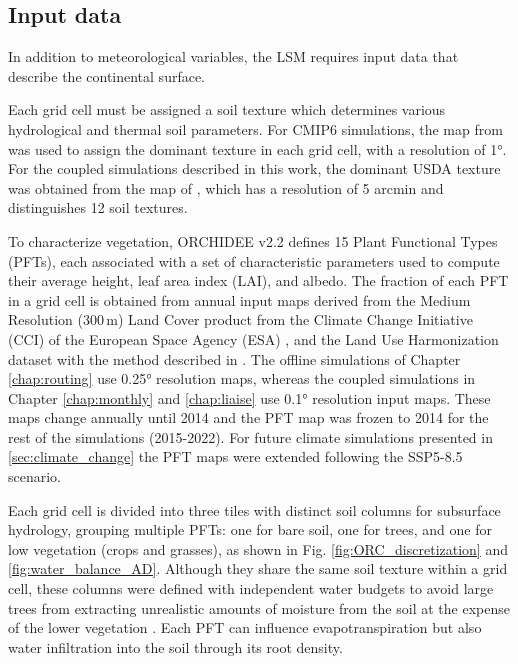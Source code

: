 \subsection{Input data}
\label{sec:ORCH_input_data}
In addition to meteorological variables, the LSM requires input data that describe the continental surface. 

Each grid cell must be assigned a soil texture which determines various hydrological and thermal soil parameters. 
For CMIP6 simulations, the map from \citet{zobler87802world} was used to assign the dominant texture in each grid cell, with a resolution of 1°. For the coupled simulations described in this work, the dominant USDA texture was obtained from the map of \citet{reynolds_estimating_2000}, which has a resolution of 5 arcmin and distinguishes 12 soil textures.

To characterize vegetation, ORCHIDEE v2.2 defines 15 Plant Functional Types (PFTs), each associated with a set of characteristic parameters used to compute their average height, leaf area index (LAI), and albedo. 
The fraction of each PFT in a grid cell is obtained from annual input maps derived from the Medium Resolution (300\,m) Land Cover product from the Climate Change Initiative (CCI) of the European Space Agency (ESA) \citep{bontemps_multi-year_2015}, and the Land Use Harmonization dataset \citep[LUH, ][]{hurtt_harmonization_2020} with the method described in \citet{lurton_implementation_2020}.
The offline simulations of Chapter \ref{chap:routing} use 0.25° resolution maps, whereas the coupled simulations in Chapter \ref{chap:monthly} and \ref{chap:liaise} use 0.1° resolution input maps. These maps change annually until 2014 and the PFT map was frozen to 2014 for the rest of the simulations (2015-2022).
For future climate simulations presented in \ref{sec:climate_change} the PFT maps were extended following the SSP5-8.5 scenario.

Each grid cell is divided into three tiles with distinct soil columns for subsurface hydrology, grouping multiple PFTs: one for bare soil, one for trees, and one for low vegetation (crops and grasses), as shown in Fig. \ref{fig:ORC_discretization} and \ref{fig:water_balance_AD}. 
Although they share the same soil texture within a grid cell, these columns were 
defined with independent water budgets to avoid large trees from extracting unrealistic amounts of moisture from the soil at the expense of the lower vegetation \citep{de1999representation}. Each PFT can influence evapotranspiration but also water infiltration into the soil through its root density.

